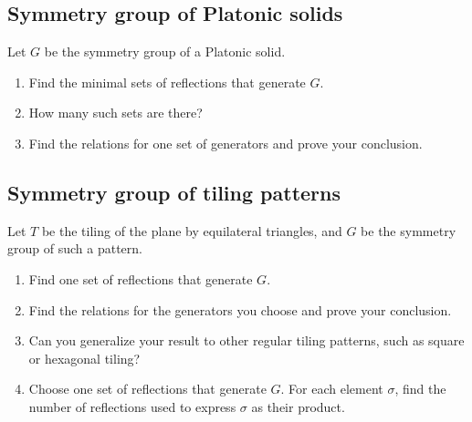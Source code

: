 \documentclass[12pt]{article}
\theoremstyle{definition}
\theoremstyle{remark}
\begin{document}
\subsection{Symmetry group of Platonic solids}
Let $G$ be the symmetry group of a Platonic solid.
\begin{enumerate}
    \item Find the minimal sets of reflections that generate $G$.
    \item How many such sets are there?
    \item Find the relations for one set of generators and prove your conclusion.
\end{enumerate}

\subsection{Symmetry group of tiling patterns}
Let $T$ be the tiling of the plane by equilateral triangles, and $G$ be the symmetry group of such a pattern.
\begin{enumerate}
    \item Find one set of reflections that generate $G$.
    \item Find the relations for the generators you choose and prove your conclusion.
    \item Can you generalize your result to other regular tiling patterns, such as square or hexagonal tiling?
    \item Choose one set of reflections that generate $G$. For each element $\sigma$, find the number of reflections used to express $\sigma$ as their product.
\end{enumerate}
\end{document}
